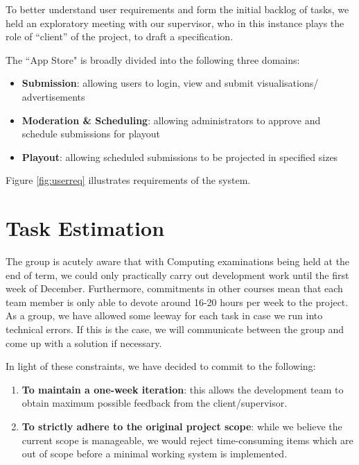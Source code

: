 \documentclass[a4paper]{article}
\begin{document}
To better understand user requirements and form the initial backlog of tasks, we held an exploratory meeting with our supervisor, who in this instance plays the role of ``client'' of the 
project, to draft a specification.

The ``App Store" is broadly divided into the following three domains:
\begin{itemize}
  \item \textbf{Submission}: allowing users to login, view and submit 
        visualisations/ advertisements
  \item \textbf{Moderation \& Scheduling}: allowing administrators to approve
        and schedule submissions for playout
  \item \textbf{Playout}: allowing scheduled submissions to be projected in
        specified sizes

\end{itemize}



Figure \ref{fig:userreq} illustrates requirements of the system.

\section{Task Estimation}
The group is acutely aware that with Computing examinations being held at the
end of term, we could only practically carry out development work until the
first week of December. Furthermore, commitments in other courses mean that 
each team member is only able to devote around 16-20 hours per week to
the project. As a group, we have allowed some leeway for each task in case we run into technical errors. If this is the case, we will communicate between the group and come up with a solution if necessary.

In light of these constraints, we have decided to commit to the following:
\begin{enumerate}
  \item \textbf{To maintain a one-week iteration}: this allows the development team to
        obtain maximum possible feedback from the client/supervisor.
  \item \textbf{To strictly adhere to the original project scope}: while we believe the
        current scope is manageable, we would reject time-consuming items which
        are out of scope before a minimal working system is implemented.
\end{enumerate}
\end{document}
